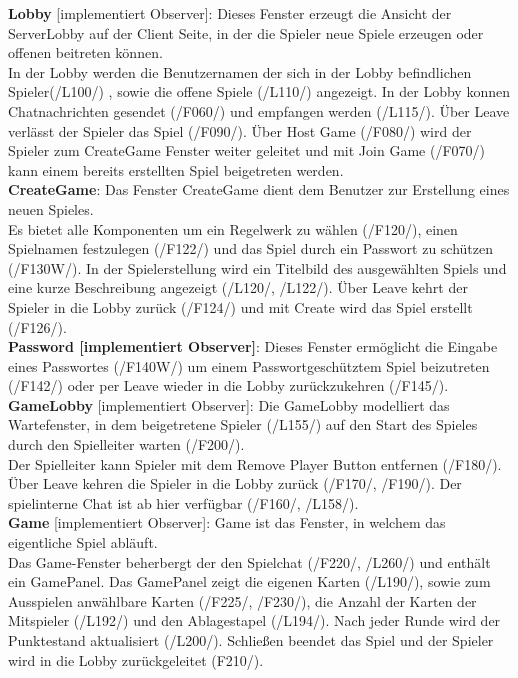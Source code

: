 \documentclass{article}
\begin{document}
\textbf{Lobby} [implementiert Observer]: Dieses Fenster erzeugt die Ansicht der ServerLobby auf der Client Seite, in der die Spieler neue Spiele erzeugen oder offenen beitreten können.\\
In der Lobby werden die Benutzernamen der sich in der Lobby befindlichen Spieler(/L100/) , sowie die  offene Spiele (/L110/) angezeigt. In der Lobby konnen Chatnachrichten gesendet (/F060/) und empfangen werden (/L115/). Über Leave verlässt der Spieler das Spiel (/F090/). Über Host Game (/F080/) wird der Spieler zum CreateGame Fenster weiter geleitet und mit Join Game (/F070/) kann einem bereits erstellten Spiel beigetreten werden. \\

\textbf{CreateGame}: Das Fenster CreateGame dient dem Benutzer zur Erstellung eines neuen Spieles.\\
Es bietet alle Komponenten um ein Regelwerk zu wählen (/F120/), einen Spielnamen festzulegen (/F122/) und das Spiel durch ein Passwort zu schützen (/F130W/). In der Spielerstellung wird ein Titelbild des ausgewählten Spiels und eine kurze Beschreibung angezeigt (/L120/, /L122/). Über Leave kehrt der Spieler in die Lobby zurück (/F124/) und mit Create wird das Spiel erstellt (/F126/).\\

\textbf{Password [implementiert Observer]}: Dieses Fenster ermöglicht die Eingabe eines Passwortes (/F140W/) um einem Passwortgeschütztem Spiel beizutreten (/F142/) oder per Leave wieder in die Lobby zurückzukehren (/F145/). \\

\textbf{GameLobby} [implementiert Observer]: Die GameLobby modelliert das Wartefenster, in dem beigetretene Spieler (/L155/) auf den Start des Spieles durch den Spielleiter warten (/F200/).\\
 Der Spielleiter kann Spieler mit dem Remove Player Button entfernen (/F180/). Über Leave kehren die Spieler in die Lobby zurück (/F170/, /F190/). Der spielinterne Chat ist ab hier verfügbar (/F160/, /L158/). \\

\textbf{Game} [implementiert Observer]: Game ist das Fenster, in welchem das eigentliche Spiel abläuft.\\
Das Game-Fenster beherbergt  der den Spielchat (/F220/, /L260/) und enthält ein GamePanel. Das GamePanel zeigt die eigenen Karten (/L190/), sowie zum Ausspielen anwählbare Karten (/F225/, /F230/), die Anzahl der Karten der Mitspieler (/L192/) und den Ablagestapel (/L194/). Nach jeder Runde wird der Punktestand  aktualisiert (/L200/). Schließen beendet das Spiel und der Spieler wird in die Lobby zurückgeleitet (F210/).\\
\end{document}
